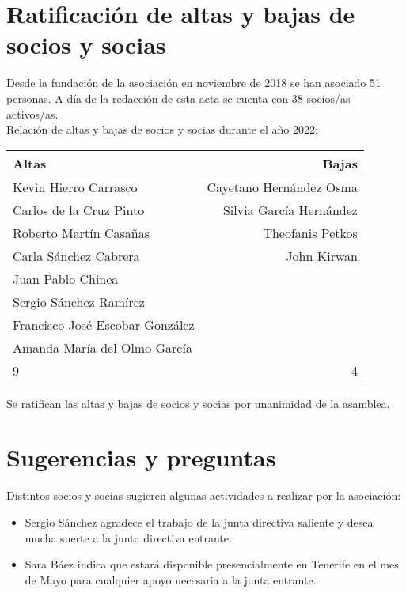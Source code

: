 \documentclass[a4paper,12pt]{article}
\begin{document}
\section{Ratificación de altas y bajas de socios y socias}

Desde la fundación de la asociación en noviembre de 2018 se han asociado 51 personas. A día de la redacción de esta acta se cuenta con 38 socios/as activos/as.\\

Relación de altas y bajas de socios y socias durante el año 2022:

\begin{center}
    \begin{tabular}{ | l | r | }
        \hline
        \textbf{Altas} & \textbf{Bajas} \\ 
        \hline
        \hline
        Kevin Hierro Carrasco & Cayetano Hernández Osma\\  
        \hline
        Carlos de la Cruz Pinto & Silvia García Hernández \\  
        \hline
        Roberto Martín Casañas & Theofanis Petkos\\  
        \hline
        Carla Sánchez Cabrera & John Kirwan\\  
        \hline
        Juan Pablo Chinea & \\  
        \hline
        Sergio Sánchez Ramírez & \\  
        \hline
        Francisco José Escobar González & \\  
        \hline
        Amanda María del Olmo García & \\  
        \hline
        \hline
        9 & 4 \\  
        \hline
    \end{tabular}
\end{center}

Se ratifican las altas y bajas de socios y socias por unanimidad de la asamblea.

\section{Sugerencias y preguntas}

Distintos socios y socias sugieren algunas actividades a realizar por la asociación:

\begin{itemize}
    \item Sergio Sánchez agradece el trabajo de la junta directiva saliente y desea mucha suerte a la junta directiva entrante.
    \item Sara Báez indica que estará disponible presencialmente en Tenerife en el mes de Mayo para cualquier apoyo necesaria a la junta entrante.
\end{itemize}
\end{document}
